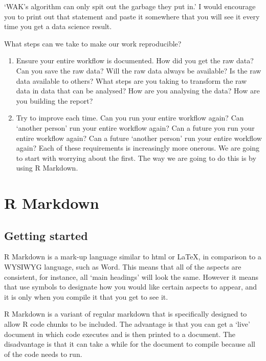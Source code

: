 \documentclass[
]{book}
\providecommand{\tightlist}{%
  \setlength{\itemsep}{0pt}\setlength{\parskip}{0pt}}
\begin{document}
`WAK's algorithm can only spit out the garbage they put in.' I would encourage you to print out that statement and paste it somewhere that you will see it every time you get a data science result.

What steps can we take to make our work reproducible?

\begin{enumerate}
\def\labelenumi{\arabic{enumi}.}
\tightlist
\item
  Ensure your entire workflow is documented. How did you get the raw data? Can you save the raw data? Will the raw data always be available? Is the raw data available to others? What steps are you taking to transform the raw data in data that can be analysed? How are you analysing the data? How are you building the report?
\item
  Try to improve each time. Can you run your entire workflow again? Can `another person' run your entire workflow again? Can a future you run your entire workflow again? Can a future `another person' run your entire workflow again? Each of these requirements is increasingly more onerous. We are going to start with worrying about the first. The way we are going to do this is by using R Markdown.
\end{enumerate}

\hypertarget{r-markdown}{%
\section{R Markdown}\label{r-markdown}}

\hypertarget{getting-started-2}{%
\subsection{Getting started}\label{getting-started-2}}

R Markdown is a mark-up language similar to html or LaTeX, in comparison to a WYSIWYG language, such as Word. This means that all of the aspects are consistent, for instance, all `main headings' will look the same. However it means that use symbols to designate how you would like certain aspects to appear, and it is only when you compile it that you get to see it.

R Markdown is a variant of regular markdown that is specifically designed to allow R code chunks to be included. The advantage is that you can get a `live' document in which code executes and is then printed to a document. The disadvantage is that it can take a while for the document to compile because all of the code needs to run.
\end{document}
